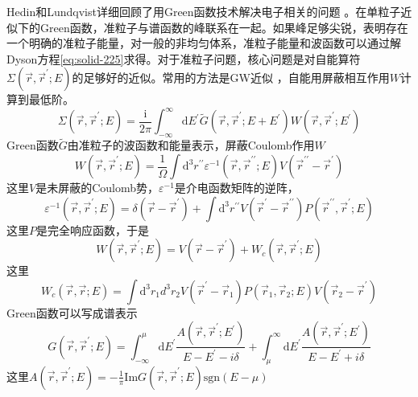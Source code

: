 {Hedin和Lundqvist详细回顾了用Green函数技术解决电子相关的问题%
。在单粒子近似下的Green函数，准粒子与谱函数的峰联系在一起。如果峰足够尖锐，表明存在一个明确的准粒子能量，对一般的非均匀体系，准粒子能量和波函数可以通过解Dyson方程\eqref{eq:solid-225}求得。对于准粒子问题，核心问题是对自能算符$\Sigma(\vec r,\vec r^{\prime};E)$的足够好的近似。常用的方法是GW近似%
，自能用屏蔽相互作用$W$计算到最低阶。
\begin{equation}
	\Sigma(\vec r,\vec r^{\prime};E)=\dfrac{\mathrm{i}}{2\pi}\int_{-\infty}^{\infty}\mathrm{d}E^{\prime}\tilde G(\vec r,\vec r^{\prime};E+E^{\prime})W(\vec r,\vec r^{\prime};E^{\prime})
  \label{eq:solid-229}
\end{equation}
Green函数$\tilde G$由准粒子的波函数和能量表示，屏蔽Coulomb作用$W$
\begin{equation}
	W(\vec r,\vec r^{\prime};E)=\frac1{\Omega}\int\mathrm{d}^3r^{\prime\prime}\varepsilon^{-1}(\vec r,\vec r^{\prime\prime};E)V(\vec r^{\prime\prime}-\vec r^{\prime})
  \label{eq:solid-230}
\end{equation}
这里$V$是未屏蔽的Coulomb势，$\varepsilon^{-1}$是介电函数矩阵的逆阵，
\begin{equation}
	\varepsilon^{-1}(\vec r,\vec r^{\prime};E)=\delta(\vec r-\vec r^{\prime})+\int\mathrm{d}^3r^{\prime\prime}V(\vec r^{\prime}-\vec r^{\prime\prime})P(\vec r^{\prime\prime},\vec r^{\prime};E)
  \label{eq:solid-231}
\end{equation}
这里$P$是完全响应函数，于是
\begin{equation}
  W(\vec r,\vec r^{\prime};E)=V(\vec r-\vec r^{\prime})+W_c(\vec r,\vec r^{\prime};E)
  \label{eq:solid-232}
\end{equation}
这里
\begin{equation}
	W_c(\vec r,\vec r;E)=\int\mathrm{d}^3r_1d^3r_2V(\vec r^{\prime}-\vec r_1)P(\vec r_1,\vec r_2;E)V(\vec r_2-\vec r^{\prime})
  \label{eq:solid-233}
\end{equation}
Green函数可以写成谱表示
\begin{equation}
	G(\vec r,\vec r^{\prime};E)=\int_{-\infty}^{\mu}\mathrm{d}E^{\prime}\frac{A(\vec r,\vec r^{\prime};E^{\prime})}{E-E^{\prime}-i\delta}+\int_{\mu}^{\infty}\mathrm{d}E^{\prime}\frac{A(\vec r,\vec r^{\prime};E^{\prime})}{E-E^{\prime}+i\delta}
  \label{eq:solid-234}
\end{equation}
这里$A(\vec r,\vec r^{\prime};E)=-\frac1{\pi}\mathrm{Im}G(\vec r,\vec r^{\prime};E)\mathrm{sgn}(E-\mu)$

}

